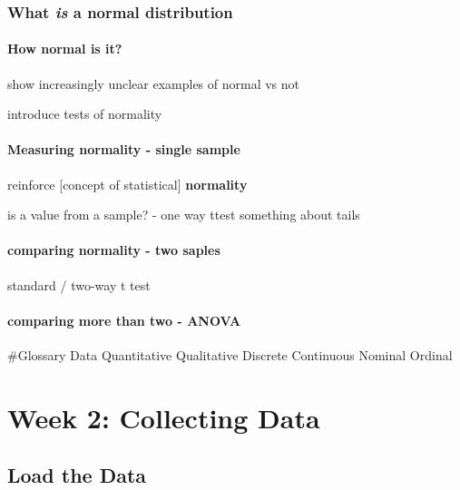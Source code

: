 \documentclass[
]{book}
\begin{document}
\hypertarget{what-is-a-normal-distribution}{%
\subsection{\texorpdfstring{What \emph{is} a \textbf{normal distribution}}{What is a normal distribution}}\label{what-is-a-normal-distribution}}

\hypertarget{how-normal-is-it}{%
\subsubsection{How normal is it?}\label{how-normal-is-it}}

show increasingly unclear examples of normal vs not

introduce tests of normality

\hypertarget{measuring-normality---single-sample}{%
\subsubsection{Measuring normality - single sample}\label{measuring-normality---single-sample}}

reinforce {[}concept of statistical{]} \textbf{normality}

is a value from a sample? - one way ttest
something about tails

\hypertarget{comparing-normality---two-saples}{%
\subsubsection{comparing normality - two saples}\label{comparing-normality---two-saples}}

standard / two-way t test

\hypertarget{comparing-more-than-two---anova}{%
\subsubsection{comparing more than two - ANOVA}\label{comparing-more-than-two---anova}}

\#Glossary
Data
Quantitative
Qualitative
Discrete
Continuous
Nominal
Ordinal

\hypertarget{week-2-collecting-data}{%
\chapter{Week 2: Collecting Data}\label{week-2-collecting-data}}

\hypertarget{load-the-data-1}{%
\section*{Load the Data}\label{load-the-data-1}}
\end{document}
